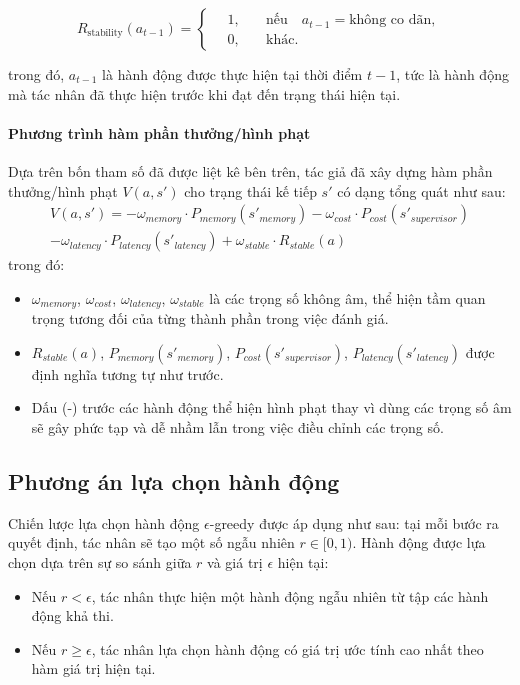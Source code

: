 \begin{equation}
    R_{\text{stability}}(a_{t-1}) =
    \begin{cases}
        \quad 1, & \quad \text{nếu} \quad a_{t-1} = \text{không co dãn}, \\
        \quad 0, & \quad \text{khác}.
    \end{cases}
\end{equation}

trong đó, $a_{t-1}$ là hành động được thực hiện tại thời điểm $t-1$, tức là hành động mà tác nhân đã thực hiện trước khi đạt đến trạng thái hiện tại.

\paragraph{Phương trình hàm phần thưởng/hình phạt}

Dựa trên bốn tham số đã được liệt kê bên trên, tác giả đã xây dựng hàm phần thưởng/hình phạt $V(a, s')$ cho trạng thái kế tiếp $s'$ có dạng tổng quát như sau:
\begin{equation}
    \begin{split}
        V(a, s') = - \omega_{memory} \cdot P_{memory}(s'_{memory}) - \omega_{cost} \cdot P_{cost}(s'_{supervisor}) \\
        - \omega_{latency} \cdot P_{latency}(s'_{latency}) + \omega_{stable} \cdot R_{stable}(a)
    \end{split}
\end{equation}
trong đó:

\begin{itemize}
    \item $\omega_{memory}$, $\omega_{cost}$, $\omega_{latency}$, $\omega_{stable}$ là các trọng số không âm, thể hiện tầm quan trọng tương đối của từng thành phần trong việc đánh giá.
    \item $R_{stable}(a)$, $P_{memory}(s'_{memory})$, $P_{cost}(s'_{supervisor})$, $P_{latency}(s'_{latency})$ được định nghĩa tương tự như trước.
    \item Dấu (-) trước các hành động thể hiện hình phạt thay vì dùng các trọng số âm sẽ gây phức tạp và dễ nhầm lẫn trong việc điều chỉnh các trọng số.
\end{itemize}

\subsection{Phương án lựa chọn hành động}

Chiến lược lựa chọn hành động $\epsilon$-greedy được áp dụng như sau: tại mỗi bước ra quyết định, tác nhân sẽ tạo một số ngẫu nhiên $r \in [0, 1)$. Hành động được lựa chọn dựa trên sự so sánh giữa $r$ và giá trị $\epsilon$ hiện tại:
\begin{itemize}
    \item Nếu $r < \epsilon$, tác nhân thực hiện một hành động ngẫu nhiên từ tập các hành động khả thi.
    \item Nếu $r \geq \epsilon$, tác nhân lựa chọn hành động có giá trị ước tính cao nhất theo hàm giá trị hiện tại.
\end{itemize}

